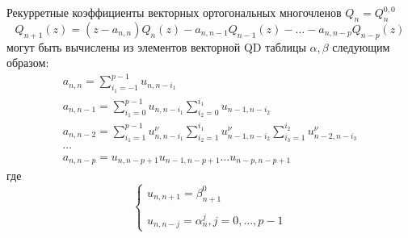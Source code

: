 \begin{teor}
Рекурретные коэффициенты векторных ортогональных многочленов $Q_n
= Q_n^{0,0}$
$$%
Q_{n+1}(z)=(z-a_{n,n})Q_n(z)-a_{n,n-1}Q_{n-1}(z)-\ldots-a_{n,n-p}Q_{n-p}(z)
$$%
могут быть вычислены из элементов векторной QD
таблицы $\alpha, \beta$ следующим образом:
%
\begin{eqnarray}
a_{n,n}=\sum\limits_{i_1=-1}^{p-1}{u_{n,n-i_1}} \nonumber\\
a_{n,n-1}=\sum\limits_{i_1=0}^{p-1}{u_{n,n-i_1}}
\sum\limits_{i_2=0}^{i_1}{u_{n-1,n-i_2}} \nonumber\\
a_{n,n-2}=\sum\limits_{i_1=1}^{p-1}{u_{n,n-i_1}^{\nu }}
\sum\limits_{i_2=1}^{i_1}{u_{n-1,n-i_2}^{\nu }}
\sum\limits_{i_3=1}^{i_2}{u_{n-2,n-i_3}^{\nu }} \nonumber \\
\cdots \nonumber\\
a_{n,n-p}={u_{n,n-p+1}}{u_{n-1,n-p+1}}\ldots {u_{n-p,n-p+1}}
\nonumber
\end{eqnarray}
%
где
\begin{equation}
\left\{
\begin{array}{llllllll}
u_{n,n+1} = \beta_{n+1}^{0} \\ \\
u_{n,n-j} = \alpha_{n}^{j}, j=0,\ldots,p-1
\end{array}
\right.
\end{equation}
\end{teor}

